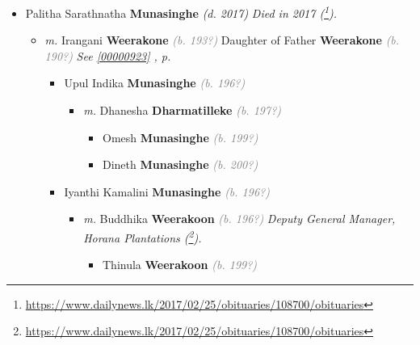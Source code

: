 \documentclass[10pt, openany]{book}
\begin{document}
\begin{itemize}
{\begin{itemize}
{\begin{itemize}
{\begin{itemize}
{     }
\item{Palitha Sarathnatha \textbf{Munasinghe} \textcolor{slorange}{\textit{(d. 2017)}} \textcolor{slmaroon}{\textit{Died in 2017 (\footnote{\url{https://www.dailynews.lk/2017/02/25/obituaries/108700/obituaries}}).}}
\begin{itemize}
\item{\textit{m.} Irangani \textbf{Weerakone} \textcolor{gray}{\textit{(b. 193?)}} Daughter of  Father \textbf{Weerakone} \textcolor{gray}{\textit{(b. 190?)}} \textcolor{slteal}{\textit{See  \autoref{00000923} \textit{, p. \pageref{00000923} }}}   \label{couple:00000551:00000927} \begin{itemize}
\item{Upul Indika \textbf{Munasinghe} \textcolor{gray}{\textit{(b. 196?)}}
\begin{itemize}
\item{\textit{m.} Dhanesha \textbf{Dharmatilleke} \textcolor{gray}{\textit{(b. 197?)}}   \label{couple:00000554:00002629} \begin{itemize}
\item{Omesh \textbf{Munasinghe} \textcolor{gray}{\textit{(b. 199?)}}
 }
\item{Dineth \textbf{Munasinghe} \textcolor{gray}{\textit{(b. 200?)}}
 }
\end{itemize}}
\end{itemize}
  }
\item{Iyanthi Kamalini \textbf{Munasinghe} \textcolor{gray}{\textit{(b. 196?)}}
\begin{itemize}
\item{\textit{m.} Buddhika \textbf{Weerakoon} \textcolor{gray}{\textit{(b. 196?)}} \textcolor{slmaroon}{\textit{Deputy General Manager, Horana Plantations (\footnote{\url{https://www.dailynews.lk/2017/02/25/obituaries/108700/obituaries}}).}}   \label{couple:00000549:00002628} \begin{itemize}
\item{Thinula \textbf{Weerakoon} \textcolor{gray}{\textit{(b. 199?)}}
 }
\end{itemize}}
\end{itemize}
  }
\end{itemize}}
\end{itemize}
  }

\end{itemize}}
\end{itemize}}
\end{itemize}}
\end{itemize}
\end{document}
